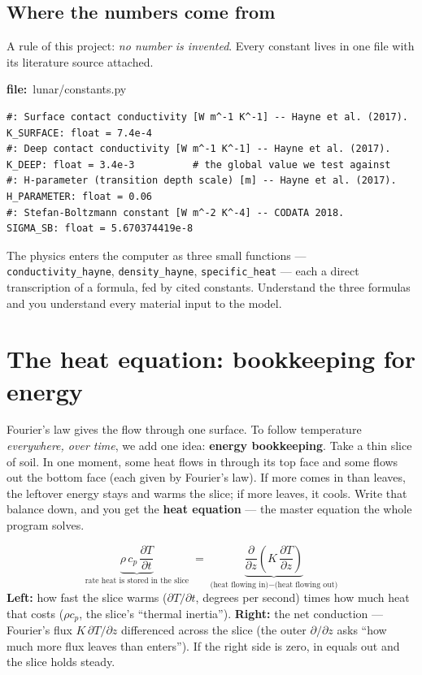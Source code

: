 \documentclass[11pt]{article}
\newcommand{\codefile}[1]{\par\smallskip\noindent
  {\footnotesize\ttfamily\color{teal!55!black}\textbf{file:}~#1}\par\nopagebreak}
\renewcommand{\codefile}[1]{\par\smallskip\noindent
    {\footnotesize\ttfamily\color{black}\textbf{file:}~#1}\par\nopagebreak}
\begin{document}
\subsection{Where the numbers come from}
A rule of this project: \emph{no number is invented}. Every constant
lives in one file with its literature source attached.
\codefile{lunar/constants.py}
\begin{lstlisting}
#: Surface contact conductivity [W m^-1 K^-1] -- Hayne et al. (2017).
K_SURFACE: float = 7.4e-4
#: Deep contact conductivity [W m^-1 K^-1] -- Hayne et al. (2017).
K_DEEP: float = 3.4e-3          # the global value we test against
#: H-parameter (transition depth scale) [m] -- Hayne et al. (2017).
H_PARAMETER: float = 0.06
#: Stefan-Boltzmann constant [W m^-2 K^-4] -- CODATA 2018.
SIGMA_SB: float = 5.670374419e-8
\end{lstlisting}
\begin{keybox}
The physics enters the computer as three small functions ---
\texttt{conductivity\_hayne}, \texttt{density\_hayne},
\texttt{specific\_heat} --- each a direct transcription of a formula, fed
by cited constants. Understand the three formulas and you understand
every material input to the model.
\end{keybox}

\section{The heat equation: bookkeeping for energy}
Fourier's law gives the flow through one surface. To follow temperature
\emph{everywhere, over time}, we add one idea: \textbf{energy
bookkeeping}. Take a thin slice of soil. In one moment, some heat flows
in through its top face and some flows out the bottom face (each given by
Fourier's law). If more comes in than leaves, the leftover energy stays
and warms the slice; if more leaves, it cools. Write that balance down,
and you get the \textbf{heat equation} --- the master equation the whole
program solves.

\begin{mathbox}
\[
\underbrace{\rho\,c_p\,\frac{\partial T}{\partial t}}
  _{\text{rate heat is stored in the slice}}
\;=\;
\underbrace{\frac{\partial}{\partial z}\!\left(K\,\frac{\partial T}{\partial z}\right)}
  _{\text{(heat flowing in)} - \text{(heat flowing out)}}
\]
\textbf{Left:} how fast the slice warms ($\partial T/\partial t$, degrees
per second) times how much heat that costs ($\rho c_p$, the slice's
``thermal inertia''). \textbf{Right:} the net conduction --- Fourier's
flux $K\,\partial T/\partial z$ differenced across the slice (the outer
$\partial/\partial z$ asks ``how much more flux leaves than enters''). If
the right side is zero, in equals out and the slice holds steady.
\end{mathbox}
\end{document}
